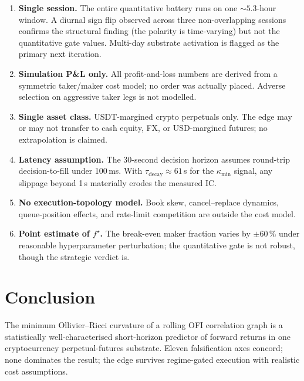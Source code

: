 \documentclass[11pt,a4paper]{article}
\begin{document}
\begin{enumerate}
  \item \textbf{Single session.} The entire quantitative battery runs on
  one $\sim\!5.3$-hour window. A diurnal sign flip observed across three
  non-overlapping sessions confirms the structural finding (the polarity
  is time-varying) but not the quantitative gate values. Multi-day
  substrate activation is flagged as the primary next iteration.

  \item \textbf{Simulation P\&L only.} All profit-and-loss numbers are
  derived from a symmetric taker/maker cost model; no order was actually
  placed. Adverse selection on aggressive taker legs is not modelled.

  \item \textbf{Single asset class.} USDT-margined crypto perpetuals only.
  The edge may or may not transfer to cash equity, FX, or USD-margined
  futures; no extrapolation is claimed.

  \item \textbf{Latency assumption.} The 30-second decision horizon
  assumes round-trip decision-to-fill under 100\,ms. With
  $\tau_{\text{decay}}\approx 61$\,s for the $\kappa_{\min}$ signal, any
  slippage beyond 1\,s materially erodes the measured IC.

  \item \textbf{No execution-topology model.} Book skew, cancel--replace
  dynamics, queue-position effects, and rate-limit competition are
  outside the cost model.

  \item \textbf{Point estimate of $f^{\star}$.} The break-even maker
  fraction varies by $\pm 60\,\%$ under reasonable hyperparameter
  perturbation; the quantitative gate is not robust, though the
  strategic verdict is.
\end{enumerate}

\section{Conclusion}
\label{sec:conclusion}

The minimum Ollivier--Ricci curvature of a rolling OFI correlation graph
is a statistically well-characterised short-horizon predictor of forward
returns in one cryptocurrency perpetual-futures substrate. Eleven
falsification axes concord; none dominates the result; the edge survives
regime-gated execution with realistic cost assumptions.
\end{document}
